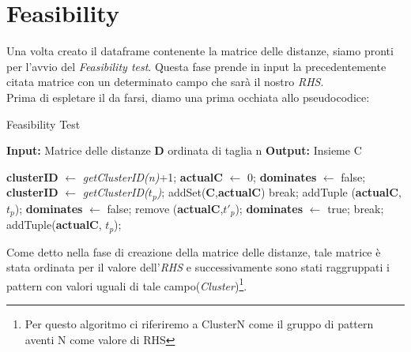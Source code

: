 \newpage
\section{Feasibility}
Una volta creato il dataframe contenente la matrice delle distanze, siamo pronti per l'avvio del \emph{Feasibility test}. Questa fase prende in input la precedentemente citata matrice con un determinato campo che sarà il nostro \emph{RHS}.\\ 
Prima di espletare il da farsi, diamo una prima occhiata allo pseudocodice:
\begin{algorithm}[H]
	\caption{Feasibility Test}
	\label{FeasibilityTestAlgoritmo}
	\textbf{Input: }Matrice delle distanze \textbf{D} ordinata di taglia n
	\newline
	\textbf{Output: }Insieme C\\
	\begin{algorithmic}[1]
		\State \textbf{clusterID} $\gets$ \emph{getClusterID(n)}+1;
		\State \textbf{actualC} $\gets$ $0$;
		\State \textbf{dominates} $\gets$ false;
			\State \textbf{clusterID} $\gets$ \emph{getClusterID($t_p$)};
				\State addSet(\textbf{C},\textbf{actualC})    
				\EndIf
			\EndIf
			\State break;   
			\EndIf
				\State addTuple (\textbf{actualC}, \emph{$t_p$});   
			\Else
				\State \textbf{dominates} $\gets$ false;
							\State remove (\textbf{actualC},$t'_p$);   
						\EndIf
					\Else
						\State \textbf{dominates} $\gets$ true;
						\State break;
					\EndIf
				\EndFor
				addTuple(\textbf{actualC}, $t_p$);
				\EndIf
			\EndIf
		\EndFor\\
		\end{algorithmic}
	\end{algorithm}
Come detto nella fase di creazione della matrice delle distanze, tale matrice è stata ordinata per il valore dell'\emph{RHS} e successivamente sono stati raggruppati i pattern con valori uguali di tale campo(\emph{Cluster})\footnote{Per questo algoritmo ci riferiremo a ClusterN come il gruppo di pattern aventi N come valore di RHS }.
